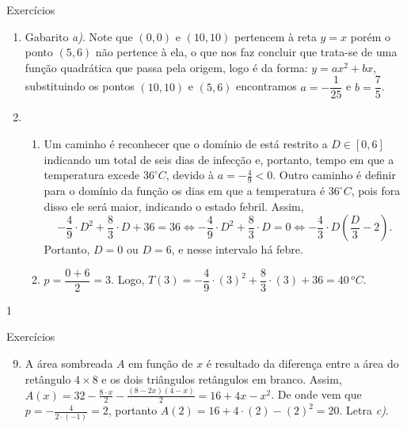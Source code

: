 {\begin{answer}{Exercícios}
{\begin{enumerate}
O perímetro do cercado é dado por: \(6+x+y+x+6+y\) .

Como o muro de 6m será aproveitado, tem-se que \(34=x+y+x+6+y\), ou seja \(y=14–x\).

A área do cercado é dada por \(A= (x + 6)y = (x + 6)(14 – x) = -x^2 + 8x + 84\), \(0 \leq x <14\) que pode ser representada graficamente  por um arco de parábola, com concavidade voltada para baixo e vértice no ponto de abscissa \(x_v=4\), que fornece o maior valor para a área. Portanto, o valor de \(y\) no cercado é \(y = 14 – x = 14 – 4 = 10\).

Logo, o cercado de maior área será o quadrado de lado igual a \(10m\).


\item Gabarito \textit{a)}. Note que \((0,0)\) e \((10,10)\) pertencem à reta \(y=x\) porém o ponto \((5,6)\) não pertence à ela, o que nos faz concluir que trata-se de uma função quadrática que passa pela origem, logo é da forma: \(y=ax^2+bx\), substituindo os pontos \((10,10)\) e \((5,6)\) encontramos \(a=-\dfrac{1}{25}\) e \(b=\dfrac{7}{5}\).


\item 
\begin{enumerate}[wide]
\item Um caminho é reconhecer que o domínio de está restrito a \(D \in [0,6]\) indicando um total de seis dias de infecção e, portanto, tempo em que a temperatura excede \(36^{\circ}C\), devido à \(a=-\frac{4}{9} <0\). Outro caminho é definir para o domínio da função os dias em que a temperatura é \(36^{\circ}C\), pois fora disso ele será maior, indicando o estado febril. Assim, \small
\begin{equation*}
-\frac{4}{9} \cdot D^2 + \frac{8}{3} \cdot D + 36 = 36 \iff -\frac{4}{9} \cdot D^2 + \frac{8}{3} \cdot D = 0 \iff -\frac{4}{3} \cdot D \left( \frac{D}{3}-2 \right) .
\end{equation*}\normalsize
Portanto, \(D=0\) ou \(D=6\), e nesse intervalo há febre.


\item \(p=\dfrac{0+6}{2}=3\). Logo, \(T(3)=-\dfrac{4}{9} \cdot (3)^2 + \dfrac{8}{3} \cdot (3) + 36 = 40 \, ^{o}C\).
\end{enumerate}
\end{enumerate}
}{1}
\end{answer}
\clearmargin
\begin{answer}{Exercícios}
{\exerciselist
\begin{enumerate}\setcounter{enumi}{8}
\item A área sombreada \(A\) em função de \(x\) é resultado da diferença entre a área do retângulo \(4 \times 8\) e os dois triângulos retângulos em branco. Assim, \(A(x) = 32 - \frac{8 \cdot x}{2} - \frac{(8-2x)(4-x)}{2} = 16+4x-x^2\). De onde vem que \(p=-\frac{4}{2 \cdot (-1)} = 2\), portanto \(A(2)=16+4 \cdot (2) - (2)^2 = 20\). Letra \textit{c)}.



\end{enumerate}}
\end{answer}}
